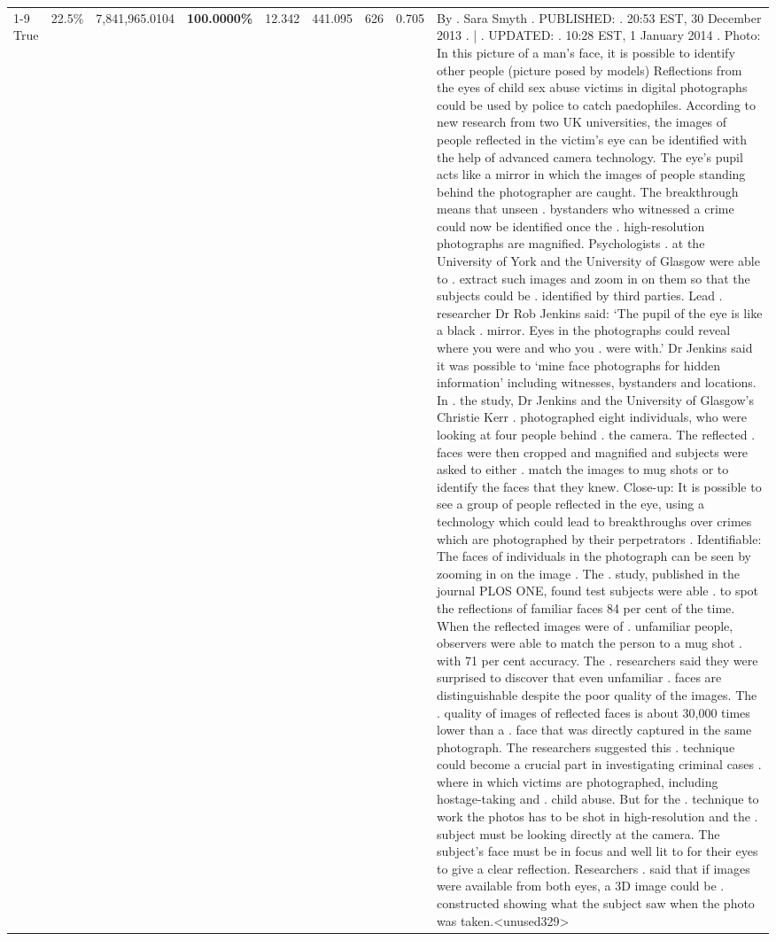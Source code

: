 \begin{table}[H]
\begin{tabular}{lllrlllll}
\cline{1-9}
True & 22.5\% & 7,841,965.0104 & \bfseries \color{red} 100.0000\% & 12.342 & 441.095 & 626 & 0.705 & By . Sara Smyth . PUBLISHED: . 20:53 EST, 30 December 2013 . | . UPDATED: . 10:28 EST, 1 January 2014 . Photo: In this picture of a man's face, it is possible to identify other people (picture posed by models) Reflections from the eyes of child sex abuse victims in digital photographs could be used by police to catch paedophiles. According to new research from two UK universities, the images of people reflected in the victim's eye can be identified with the help of advanced camera technology. The eye's pupil acts like a mirror in which the images of people standing behind the photographer are caught. The breakthrough means that unseen . bystanders who witnessed a crime could now be identified once the . high-resolution photographs are magnified. Psychologists . at the University of York and the University of Glasgow were able to . extract such images and zoom in on them so that the subjects could be . identified by third parties. Lead . researcher Dr Rob Jenkins said: ‘The pupil of the eye is like a black . mirror. Eyes in the photographs could reveal where you were and who you . were with.' Dr Jenkins said it was possible to ‘mine face photographs for hidden information' including witnesses, bystanders and locations. In . the study, Dr Jenkins and the University of Glasgow's Christie Kerr . photographed eight individuals, who were looking at four people behind . the camera. The reflected . faces were then cropped and magnified and subjects were asked to either . match the images to mug shots or to identify the faces that they knew. Close-up: It is possible to see a group of people reflected in the eye, using a technology which could lead to breakthroughs over crimes which are photographed by their perpetrators . Identifiable: The faces of individuals in the photograph can be seen by zooming in on the image . The . study, published in the journal PLOS ONE, found test subjects were able . to spot the reflections of familiar faces 84 per cent of the time. When the reflected images were of . unfamiliar people, observers were able to match the person to a mug shot . with 71 per cent accuracy. The . researchers said they were surprised to discover that even unfamiliar . faces are distinguishable despite the poor quality of the images. The . quality of images of reflected faces is about 30,000 times lower than a . face that was directly captured in the same photograph. The researchers suggested this . technique could become a crucial part in investigating criminal cases . where in which victims are photographed, including hostage-taking and . child abuse. But for the . technique to work the photos has to be shot in high-resolution and the . subject must be looking directly at the camera. The subject's face must be in focus and well lit to for their eyes to give a clear reflection. Researchers . said that if images were available from both eyes, a 3D image could be . constructed showing what the subject saw when the photo was taken.<unused329> \\

\end{tabular}
\end{table}
